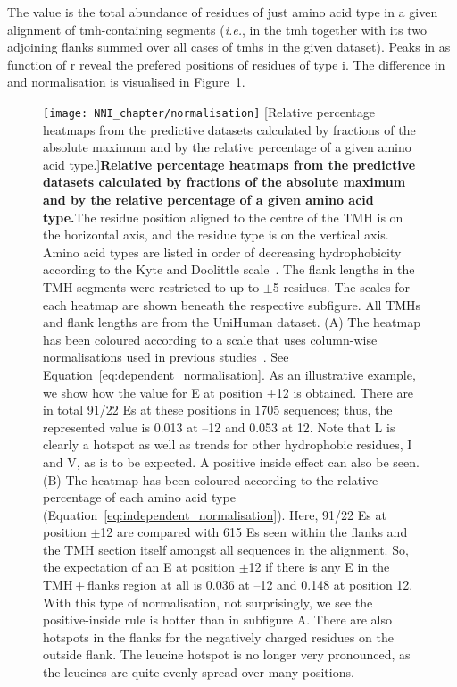 The value  is the total abundance of residues of just amino acid type  in a given alignment of \gls{tmh}-containing segments (\textit{i.e.}, in the \gls{tmh} together with its two adjoining flanks summed over all cases of \gls{tmh}s in the given dataset).
Peaks in as function of r reveal the prefered positions of residues of type i.
The difference in   and   normalisation is visualised in Figure~\ref{fig:normalisation}.

\begin{figure}[!ht]
\centering
\texttt{[image: NNI\_chapter/normalisation]}
[Relative percentage heatmaps from the predictive datasets calculated by fractions of the absolute maximum and by the relative percentage of a given amino acid type.]{\textbf{Relative percentage heatmaps from the predictive datasets calculated by fractions of the absolute maximum and by the relative percentage of a given amino acid type.}The residue position aligned to the centre of the TMH is on the horizontal axis, and the residue type is on the vertical axis.
Amino acid types are listed in order of decreasing hydrophobicity according to the Kyte and Doolittle scale~\cite{Kyte1982}.
The flank lengths in the TMH segments were restricted to up to $\pm$5 residues.
The scales for each heatmap are shown beneath the respective subfigure.
All TMHs and flank lengths are from the UniHuman dataset.
(A) The heatmap has been coloured according to a scale that uses column-wise normalisations used in previous studies~\cite{Sharpe2010}.
See Equation~\ref{eq:dependent_normalisation}.
As an illustrative example, we show how the value for E at position $\pm$12 is obtained.
There are in total 91/22 Es at these positions in 1705 sequences; thus, the represented value is 0.013 at –12 and 0.053 at 12.
Note that L is clearly a hotspot as well as trends for other hydrophobic residues, I and V, as is to be expected.
A positive inside effect can also be seen.
(B) The heatmap has been coloured according to the relative percentage of each amino acid type (Equation~\ref{eq:independent_normalisation}).
Here, 91/22 Es at position $\pm$12 are compared with 615 Es seen within the flanks and the TMH section itself amongst all sequences in the alignment.
So, the expectation of an E at position $\pm$12 if there is any E in the TMH + flanks region at all is 0.036 at –12 and 0.148 at position 12.
With this type of normalisation, not surprisingly, we see the positive-inside rule is hotter than in subfigure A.
There are also hotspots in the flanks for the negatively charged residues on the outside flank.
The leucine hotspot is no longer very pronounced, as the leucines are quite evenly spread over many positions.}

\label{fig:normalisation}
\end{figure}

